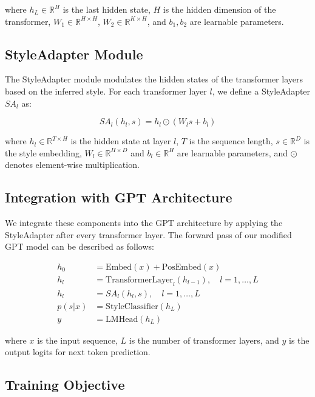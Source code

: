 \documentclass{article} %
\begin{document}
where $h_L \in \mathbb{R}^H$ is the last hidden state, $H$ is the hidden dimension of the transformer, $W_1 \in \mathbb{R}^{H \times H}$, $W_2 \in \mathbb{R}^{K \times H}$, and $b_1, b_2$ are learnable parameters.

\subsection{StyleAdapter Module}

The StyleAdapter module modulates the hidden states of the transformer layers based on the inferred style. For each transformer layer $l$, we define a StyleAdapter $SA_l$ as:

\begin{equation}
    SA_l(h_l, s) = h_l \odot (W_l s + b_l)
\end{equation}

where $h_l \in \mathbb{R}^{T \times H}$ is the hidden state at layer $l$, $T$ is the sequence length, $s \in \mathbb{R}^D$ is the style embedding, $W_l \in \mathbb{R}^{H \times D}$ and $b_l \in \mathbb{R}^H$ are learnable parameters, and $\odot$ denotes element-wise multiplication.

\subsection{Integration with GPT Architecture}

We integrate these components into the GPT architecture by applying the StyleAdapter after every transformer layer. The forward pass of our modified GPT model can be described as follows:

\begin{align}
    h_0 &= \text{Embed}(x) + \text{PosEmbed}(x) \\
    h_l &= \text{TransformerLayer}_l(h_{l-1}), \quad l = 1, \ldots, L \\
    h_l &= SA_l(h_l, s), \quad l = 1, \ldots, L \\
    p(s|x) &= \text{StyleClassifier}(h_L) \\
    y &= \text{LMHead}(h_L)
\end{align}

where $x$ is the input sequence, $L$ is the number of transformer layers, and $y$ is the output logits for next token prediction.

\subsection{Training Objective}
\end{document}
